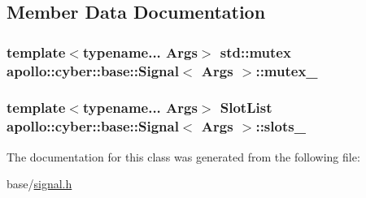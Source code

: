 \subsection{Member Data Documentation}
\hypertarget{classapollo_1_1cyber_1_1base_1_1Signal_ae4fbfc9ce2e69ed7fb06aca207f44c70}{
\subsubsection[{mutex\-\_\-}]{\setlength{\rightskip}{0pt plus 5cm}template$<$typename... Args$>$ std\-::mutex {\bf apollo\-::cyber\-::base\-::\-Signal}$<$ Args $>$\-::mutex\-\_\-\hspace{0.3cm}{\ttfamily [private]}}}\label{classapollo_1_1cyber_1_1base_1_1Signal_ae4fbfc9ce2e69ed7fb06aca207f44c70}
\hypertarget{classapollo_1_1cyber_1_1base_1_1Signal_a8b2235cb5214ea2dde45e5b2f678112b}{
\subsubsection[{slots\-\_\-}]{\setlength{\rightskip}{0pt plus 5cm}template$<$typename... Args$>$ {\bf Slot\-List} {\bf apollo\-::cyber\-::base\-::\-Signal}$<$ Args $>$\-::slots\-\_\-\hspace{0.3cm}{\ttfamily [private]}}}\label{classapollo_1_1cyber_1_1base_1_1Signal_a8b2235cb5214ea2dde45e5b2f678112b}


The documentation for this class was generated from the following file\-:\begin{DoxyCompactItemize}
\item 
base/\hyperlink{signal_8h}{signal.\-h}\end{DoxyCompactItemize}
